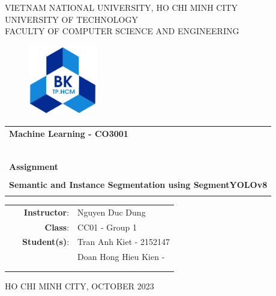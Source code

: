 \documentclass[a4paper]{article}
\begin{document}
\begin{titlepage}
\begin{center}
VIETNAM NATIONAL UNIVERSITY, HO CHI MINH CITY \\
UNIVERSITY OF TECHNOLOGY \\
FACULTY OF COMPUTER SCIENCE AND ENGINEERING
\end{center}

\vspace{1cm}

\begin{figure}[h!]
\begin{center}
\includegraphics[width=3cm]{hcmut.png}
\end{center}
\end{figure}

\vspace{1cm}


\begin{center}
\begin{tabular}{c}
\multicolumn{1}{l}{\textbf{{\Large Machine Learning - CO3001}}}\\
~~\\
\hline
\\
\multicolumn{1}{l}{\textbf{{\Large Assignment}}}\\
\\
\textbf{{\Huge Semantic and Instance Segmentation using SegmentYOLOv8}}\\
\\
\hline
\end{tabular}
\end{center}

\vspace{3cm}

\begin{table}[h]
\begin{tabular}{rrl}
\hspace{3 cm} & \textbf{{\ Instructor}}: & Nguyen Duc Dung \\
\hspace{3 cm} & \textbf{{\ Class}}: & CC01 - Group 1 \\
\hspace{3 cm} & \textbf{{\ Student(s)}}: & Tran Anh Kiet - 2152147 \\ 
& &  Doan Hong Hieu Kien - \\
& &   \\
& &   \\
\end{tabular}
\end{table}

\begin{center}
{\footnotesize HO CHI MINH CITY, OCTOBER 2023}
\end{center}
\end{titlepage}
\end{document}
